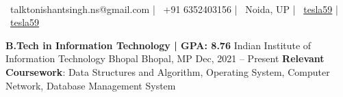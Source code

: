 \documentclass[]{awesome-cv}
\begin{document}
\begin{center}
      \\
    \vspace{2mm}
    {\faEnvelope\ talktonishantsingh.ns@gmail.com} | {\faMobile\ +91 6352403156} | {\faMapMarker\ Noida, UP} | {\faLinkedinSquare\ \href{https://www.linkedin.com/in/tesla59/}{tesla59}} | {\faGithubSquare\ \href{https://www.github.com/tesla59/}{tesla59}} \
\end{center}
\vspace{-3mm}
\begin{cventries}
    \cventry
    {\textbf{B.Tech in Information Technology | GPA: 8.76 }}
    {Indian Institute of Information Technology Bhopal}
    {Bhopal, MP}
    {Dec, 2021 – Present}
    {\hspace{-22mm}\textbf{Relevant Coursework}: Data Structures and Algorithm, Operating System, Computer Network, Database Management System}
\end{cventries}
\vspace{-5mm}
\end{document}

